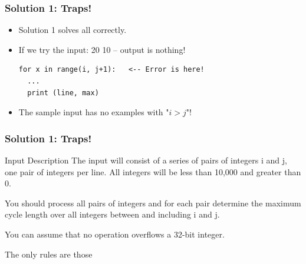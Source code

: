 \documentclass{beamer}
\begin{document}
\begin{frame}[fragile]
  \frametitle{Solution 1: Traps!}

  \begin{itemize}
    \item Solution 1 solves all  correctly.
    \bigskip

    \item If we try the input: \alert{20 10} -- output is \alert{nothing!}
\begin{verbatim}
for x in range(i, j+1):   <-- Error is here!
  ...
  print (line, max)
\end{verbatim}
    \bigskip

    \item The sample input has \alert{no examples} with "\alert{$i > j$}"!
  \end{itemize}
\end{frame}

\begin{frame}
  \frametitle{Solution 1: Traps!}

    \begin{block}{Input Description}
    The input will consist of a series of \alert{pairs of integers} i and j, one pair of
    integers per line. All integers will be \alert{less than 10,000 and greater than 0.}

    \bigskip

    You should process all pairs of integers and for each pair determine the maximum
    cycle length over \alert{all integers between and including i and j}.

    \bigskip

    You can \alert{assume that no operation overflows a 32-bit integer}.
    \end{block}
    \bigskip

    The only rules are those 
\end{frame}
\end{document}
